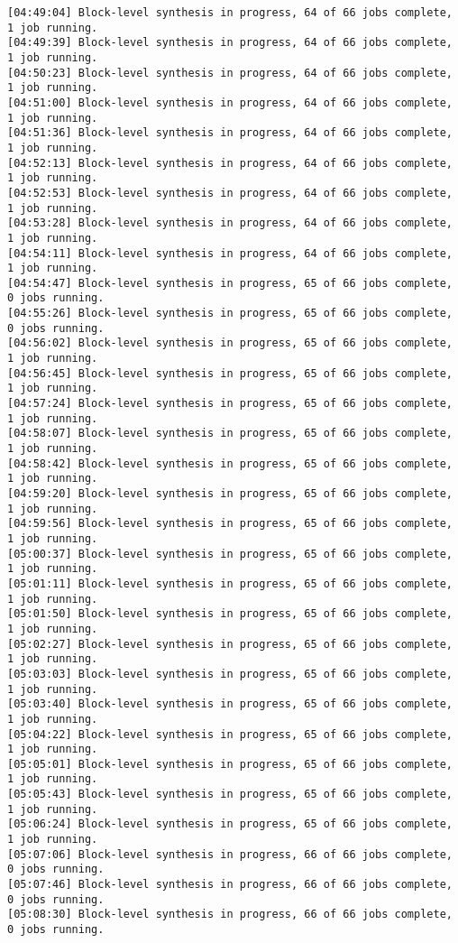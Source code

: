 \begin{center}
\begin{lstlisting}[label=lst:vlog,caption=Файл v++\_vinc.log]
[04:49:04] Block-level synthesis in progress, 64 of 66 jobs complete, 1 job running.
[04:49:39] Block-level synthesis in progress, 64 of 66 jobs complete, 1 job running.
[04:50:23] Block-level synthesis in progress, 64 of 66 jobs complete, 1 job running.
[04:51:00] Block-level synthesis in progress, 64 of 66 jobs complete, 1 job running.
[04:51:36] Block-level synthesis in progress, 64 of 66 jobs complete, 1 job running.
[04:52:13] Block-level synthesis in progress, 64 of 66 jobs complete, 1 job running.
[04:52:53] Block-level synthesis in progress, 64 of 66 jobs complete, 1 job running.
[04:53:28] Block-level synthesis in progress, 64 of 66 jobs complete, 1 job running.
[04:54:11] Block-level synthesis in progress, 64 of 66 jobs complete, 1 job running.
[04:54:47] Block-level synthesis in progress, 65 of 66 jobs complete, 0 jobs running.
[04:55:26] Block-level synthesis in progress, 65 of 66 jobs complete, 0 jobs running.
[04:56:02] Block-level synthesis in progress, 65 of 66 jobs complete, 1 job running.
[04:56:45] Block-level synthesis in progress, 65 of 66 jobs complete, 1 job running.
[04:57:24] Block-level synthesis in progress, 65 of 66 jobs complete, 1 job running.
[04:58:07] Block-level synthesis in progress, 65 of 66 jobs complete, 1 job running.
[04:58:42] Block-level synthesis in progress, 65 of 66 jobs complete, 1 job running.
[04:59:20] Block-level synthesis in progress, 65 of 66 jobs complete, 1 job running.
[04:59:56] Block-level synthesis in progress, 65 of 66 jobs complete, 1 job running.
[05:00:37] Block-level synthesis in progress, 65 of 66 jobs complete, 1 job running.
[05:01:11] Block-level synthesis in progress, 65 of 66 jobs complete, 1 job running.
[05:01:50] Block-level synthesis in progress, 65 of 66 jobs complete, 1 job running.
[05:02:27] Block-level synthesis in progress, 65 of 66 jobs complete, 1 job running.
[05:03:03] Block-level synthesis in progress, 65 of 66 jobs complete, 1 job running.
[05:03:40] Block-level synthesis in progress, 65 of 66 jobs complete, 1 job running.
[05:04:22] Block-level synthesis in progress, 65 of 66 jobs complete, 1 job running.
[05:05:01] Block-level synthesis in progress, 65 of 66 jobs complete, 1 job running.
[05:05:43] Block-level synthesis in progress, 65 of 66 jobs complete, 1 job running.
[05:06:24] Block-level synthesis in progress, 65 of 66 jobs complete, 1 job running.
[05:07:06] Block-level synthesis in progress, 66 of 66 jobs complete, 0 jobs running.
[05:07:46] Block-level synthesis in progress, 66 of 66 jobs complete, 0 jobs running.
[05:08:30] Block-level synthesis in progress, 66 of 66 jobs complete, 0 jobs running.

\end{lstlisting}
\end{center}
